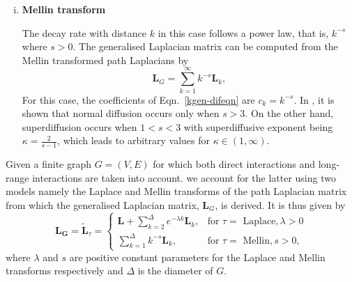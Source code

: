 \documentclass[10pt,a4paper]{article}
\theoremstyle{plain}
\theoremstyle{definition}
\begin{document}
\begin{enumerate}[1)]
\begin{enumerate}[i)]
    	    	\item \textbf{Mellin transform}
    	    	
    	    	The decay rate with distance $k$ in this case follows a power law, that is, $k^{-s}$ where $s>0$. 
    	    	The generalised Laplacian matrix can be computed from the Mellin transformed path Laplacians by
    	    	\begin{equation}
    	    	\mathbf{L}_{G} = \sum_{k=1}^{\infty} k^{-s} \mathbf{L}_k,
    	    	\label{mellin-transforms}
    	    	\end{equation}
    	    	 For this case, the coefficients of Eqn.~\ref{kgen-difeqn} are $c_{k} = k^{-s}$. 	
    	    	In \citep{estrada2017path}, it is shown that normal diffusion occurs only when $s > 3$. On the other hand, superdiffusion occurs when $1 <s < 3$ with superdiffusive exponent being $ \kappa = \frac{2}{s-1}$,
    	    	which leads to arbitrary values for $\kappa \in (1,\infty)$. 
    	    \end{enumerate}
        \end{enumerate}
        Given a finite graph $G=(V,E)$ for which both direct interactions and long-range interactions are taken into account. we account for the latter using two models namely the Laplace and Mellin transforms of the path Laplacian matrix from which the generalised Laplacian matrix, $\mathbf{L}_G$, is derived. It is thus given by
        \begin{equation}
        \mathbf{L_G} = \tilde{\mathbf{L}}_\tau = \begin{cases} 
        \mathbf{L} + \sum_{k=2}^{\Delta} e^{-\lambda k}  \mathbf{L}_k, & \mbox{for } \tau = \text{ Laplace},\lambda > 0 \\
        \sum_{k=1}^{\Delta} k^{-s} \mathbf{L}_k, &\mbox{for }  \tau = \text{ Mellin}, s>0,
        \end{cases} 
        \end{equation}
        where $\lambda$ and $s$ are positive constant parameters for the Laplace and Mellin transforms respectively and $\Delta$ is the diameter of $G$. 
        
\end{document}
